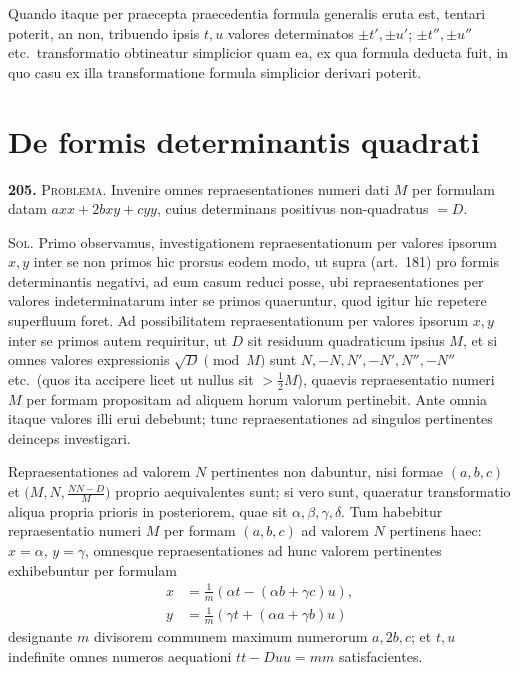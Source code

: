 \documentclass[12pt,a4paper]{article}
\theoremstyle{plain}
\theoremstyle{definition}
\theoremstyle{remark}
\begin{document}
Quando itaque per praecepta praecedentia formula generalis eruta est, tentari poterit, an non, tribuendo ipsis $t,u$ valores determinatos $\pm t',\pm u'$; $\pm t'',\pm u''$ etc.\ transformatio obtineatur simplicior quam ea, ex qua formula deducta fuit, in quo casu ex illa transformatione formula simplicior derivari poterit.


\section*{De formis determinantis quadrati}

\textbf{205.} \textsc{Problema.} Invenire omnes repraesentationes numeri dati $M$ per formulam datam $axx+2bxy+cyy$, cuius determinans positivus non-quadratus $=D$.

\textsc{Sol.} Primo observamus, investigationem repraesentationum per valores ipsorum $x,y$ inter se non primos hic prorsus eodem modo, ut supra (art.~181) pro formis determinantis negativi, ad eum casum reduci posse, ubi repraesentationes per valores indeterminatarum inter se primos quaeruntur, quod igitur hic repetere superfluum foret. Ad possibilitatem repraesentationum per valores ipsorum $x,y$ inter se primos autem requiritur, ut $D$ sit residuum quadraticum ipsius $M$, et si omnes valores expressionis $\sqrt{D}\pmod{M}$ sunt $N,-N,N',-N',N'',-N''$ etc.\ (quos ita accipere licet ut nullus sit $>\frac{1}{2}M$), quaevis repraesentatio numeri $M$ per formam propositam ad aliquem horum valorum pertinebit. Ante omnia itaque valores illi erui debebunt; tunc repraesentationes ad singulos pertinentes deinceps investigari.

Repraesentationes ad valorem $N$ pertinentes non dabuntur, nisi formae $(a,b,c)$ et $\bigl(M,N,\frac{NN-D}{M}\bigr)$ proprio aequivalentes sunt; si vero sunt, quaeratur transformatio aliqua propria prioris in posteriorem, quae sit $\alpha,\beta,\gamma,\delta$. Tum habebitur repraesentatio numeri $M$ per formam $(a,b,c)$ ad valorem $N$ pertinens haec: $x=\alpha$, $y=\gamma$, omnesque repraesentationes ad hunc valorem pertinentes exhibebuntur per formulam
\begin{align*}
x&=\tfrac{1}{m}(\alpha t-(\alpha b+\gamma c)u),\\
y&=\tfrac{1}{m}(\gamma t+(\alpha a+\gamma b)u)
\end{align*}
designante $m$ divisorem communem maximum numerorum $a,2b,c$; et $t,u$ indefinite omnes numeros aequationi $tt-Duu=mm$ satisfacientes.
\end{document}
